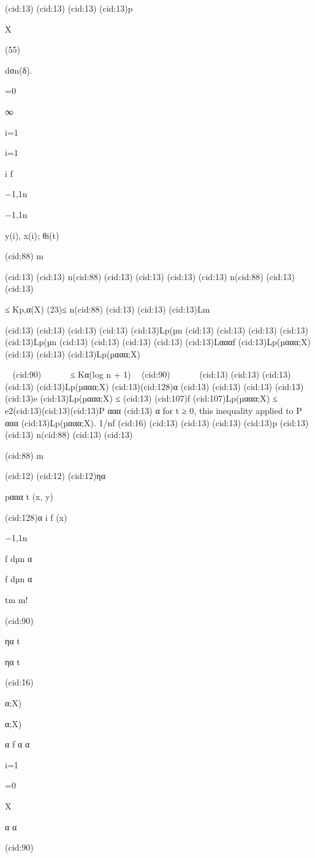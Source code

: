 {(cid:13)
(cid:13)
(cid:13)
(cid:13)p

X

(55)

dσn(δ).

=0

∞

i=1

i=1

i f

{−1,1}n

{−1,1}n

y(i), x(i); θi(t)

(cid:88) m

(cid:13)
(cid:13) n(cid:88)
(cid:13)
(cid:13)
(cid:13)
(cid:13) n(cid:88)
(cid:13)
(cid:13)

≤ Kp,α(X)
(23)≤ n(cid:88)
(cid:13)
(cid:13)
(cid:13)Lm

(cid:13)
(cid:13)
(cid:13)
(cid:13)
(cid:13)Lp(µn
(cid:13)
(cid:13)
(cid:13)
(cid:13)
(cid:13)Lp(µn
(cid:13)
(cid:13)
(cid:13)
(cid:13)
(cid:13)Lαααf
(cid:13)Lp(µααα;X)
(cid:13)
(cid:13)
(cid:13)Lp(µααα;X)


(cid:90)





≤ Kα(log n + 1)

(cid:90)





(cid:13)
(cid:13)
(cid:13)
(cid:13)
(cid:13)Lp(µααα;X)
(cid:13)(cid:128)α
(cid:13)
(cid:13)
(cid:13)
(cid:13)
(cid:13)e
(cid:13)Lp(µααα;X)
≤
(cid:13)
(cid:107)f (cid:107)Lp(µααα;X) ≤ e2(cid:13)(cid:13)(cid:13)P ααα
(cid:13)
α for t ≥ 0, this inequality applied to P ααα
(cid:13)Lp(µααα;X).
1/nf
(cid:16)
(cid:13)
(cid:13)
(cid:13)
(cid:13)p
(cid:13)
(cid:13) n(cid:88)
(cid:13)
(cid:13)

(cid:88) m

(cid:12)
(cid:12)
(cid:12)ηα

pααα
t (x, y)

(cid:128)α
i f (x)

{−1,1}n

f dµn
α

f dµn
α

tm
m!

(cid:90)

ηα
t

ηα
t

(cid:16)

α;X)

α;X)

α f
α
α

i=1

=0

X

α
α

(cid:90)

}
